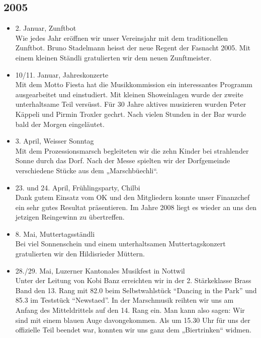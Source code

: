 \subsection*{2005}

\begin{history}


    \begin{itemize}

        \item 2. Januar, Zunftbot\\
              Wie jedes Jahr eröffnen wir unser Vereinsjahr mit dem traditionellen
              Zunftbot. Bruno Stadelmann heisst der neue Regent der Fasnacht 2005. Mit
              einem kleinen Ständli gratulierten wir dem neuen Zunftmeister.

        \item 10/11. Januar, Jahreskonzerte\\
              Mit dem Motto Fiesta hat die Musikkommission ein interessantes Programm
              ausgearbeitet und einstudiert. Mit kleinen Showeinlagen wurde der zweite
              unterhaltsame Teil versüsst. Für 30 Jahre aktives musizieren wurden
              Peter Käppeli und Pirmin Troxler gechrt. Nach vielen Stunden in der Bar
              wurde bald der Morgen eingeläutet.

        \item 3. April, Weisser Sonntag\\
              Mit dem Prozessionsmarsch begleiteten wir die zehn Kinder bei
              strahlender Sonne durch das Dorf. Nach der Messe spielten wir der
              Dorfgemeinde verschiedene Stücke aus dem „Marschbüechli“.

        \item 23. und 24. April, Frühlingsparty, Chilbi\\
              Dank gutem Einsatz vom OK und den
              Mitgliedern konnte unser Finanzchef ein sehr gutes Resultat präsentieren.
              Im Jahre 2008 liegt es wieder an uns den jetzigen Reingewinn zu
              übertreffen.

        \item 8. Mai, Muttertagsständli\\
              Bei viel Sonnenschein und einem unterhaltsamen Muttertagskonzert
              gratulierten wir den Hildisrieder Müttern.

        \item 28./29. Mai, Luzerner Kantonales Musikfest in Nottwil\\
              Unter der Leitung von Kobi Banz erreichten wir in der 2. Stärkeklasse
              Brass Band den 13. Rang mit 82.0 beim Selbstwahlstück \enquote{Dancing in the
                  Park} und 85.3 im Teststück \enquote{Newstaed}. In der Marschmusik reihten wir
              uns am Anfang des Mitteldrittels auf den 14. Rang ein. Man kann also
              sagen: Wir sind mit einem blauen Auge davongekommen. Als um 15.30 Uhr
              für uns der offizielle Teil beendet war, konnten wir uns ganz dem
              „Biertrinken“ widmen.


\end{itemize}
\end{history}
